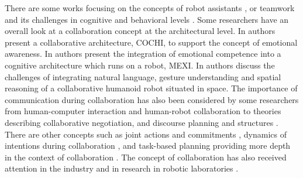 \documentclass[12pt]{report}
\begin{document}
There are some works focusing on the concepts of robot assistants
\cite{clancey:agent-assistants-collaboration}, or teamwork and its challenges in
cognitive and behavioral levels \cite{nikolaidis:collaboration-joint-action,
scerri:prototype-distributed-teams}. Some researchers
have an overall look at a collaboration concept at the architectural level. In
\cite{garcia:collaboration-emotional-awareness} authors present a collaborative
architecture, COCHI, to support the concept of emotional awareness. In
\cite{esau:integrating-emotion-collaboration} authors present the integration of
emotional competence into a cognitive architecture which runs on a robot, MEXI.
In \cite{sofge:collaboration-humanoid-space} authors discuss the challenges of
integrating natural language, gesture understanding and spatial reasoning of a
collaborative humanoid robot situated in space. The importance of communication
during collaboration has also been considered by some researchers from
human-computer interaction and human-robot collaboration
\cite{clair:action-intention-collaboraiton,
matignon:verbal-nonverbal-collaboration, rich:discourse} to theories describing
collaborative negotiation, and discourse planning and structures
\cite{andriessen:disourse-planning, grosz:discourse-structure,
sidner:discourse-collaborative-negotiation}. There are other concepts such as
joint actions and commitments \cite{grosz:intention-dynamics-collaboration},
dynamics of intentions during collaboration \cite{levesque:acting-together}, and
task-based planning providing more depth in the context of collaboration
\cite{burghart:cognitive-architecture-robot, rich:cea}. The concept of
collaboration has also received attention in the industry and in research in
robotic laboratories \cite{green:collaboration-literature-review}.
\end{document}
